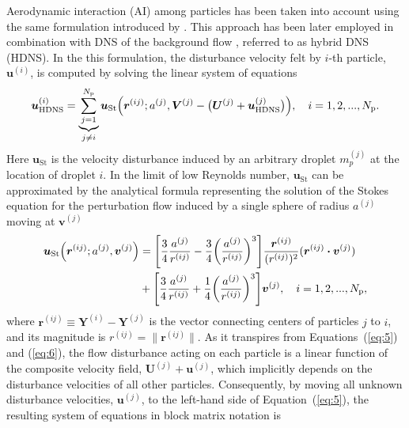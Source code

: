 \documentclass[../thesis.tex]{subfiles}
\begin{document}
Aerodynamic interaction (AI) among particles has been taken into account using the same formulation introduced by \cite{WAG05}. This approach has been later employed in combination with DNS of the background flow \citep{AGW07}, referred to as hybrid DNS (HDNS). In the this formulation, the disturbance velocity felt by $i$-th particle, $\boldsymbol{u}^{(i)}$, is computed by solving the linear system of equations
\begin{align}
\boldsymbol{u}_\text{HDNS}^{(i)}=
\underbrace{\sum_{j=1}^{N_{\text p}}}_{j\neq{i}}{\boldsymbol{u}_\text{St}}\Big(\boldsymbol{r}^{(ij)};a^{(j)},{\boldsymbol{V}^{(j)}}-\big({\boldsymbol{U}^{(j)}}+{\boldsymbol{u}_\text{HDNS}^{(j)}}\big)\Big),\quad
i=1,2,...,N_{\text p}.\label{eq:5}
\end{align}
Here ${\boldsymbol{u}_\text{St}}$ is the velocity disturbance induced by an arbitrary droplet $m_p^{(j)}$ at the location of droplet $i$. In the limit of low Reynolds number, ${\boldsymbol{u}_\text{St}}$ can be approximated by the analytical formula representing the solution of the Stokes equation for the perturbation flow induced by a single sphere of radius $a^{(j)}$ moving at ${\boldsymbol{v}}^{(j)}$
\begin{align}
\boldsymbol{u}_{\text{St}}\Big(\boldsymbol{r}^{(ij)};a^{(j)},{\boldsymbol{v}^{(j)}}\Big)&=\Bigg[\frac{3}{4}\frac{a^{(j)}}{{r}^{(ij)}}-\frac{3}{4}\bigg(\frac{a^{(j)}}{{r}^{(ij)}}\bigg)^{3}\Bigg]\frac{\boldsymbol{r}^{(ij)}}{({r}^{(ij)})^2}(\boldsymbol{r}^{(ij)}\boldsymbol{\cdot}\boldsymbol{v}^{(j)}) \nonumber\\
&+ \Bigg[\frac{3}{4}\frac{a^{(j)}}{{r}^{(ij)}}+\frac{1}{4}\bigg(\frac{a^{(j)}}{{r}^{(ij)}}\bigg)^{3}\Bigg]\boldsymbol{v}^{(j)},\quad
i=1,2,...,N_{\text p},\label{eq:6}
\end{align}
where $\boldsymbol{r}^{(ij)} \equiv \boldsymbol{Y}^{(i)}-\boldsymbol{Y}^{(j)}$ is the vector connecting centers of particles $j$ to $i$, and its magnitude is $\mathit{r}^{(ij)}=\|\boldsymbol{r}^{(ij)}\|$. As it transpires from Equations~(\ref{eq:5}) and (\ref{eq:6}), the flow disturbance acting on each particle is a linear function of the composite velocity field, ${\boldsymbol{U}^{(j)}}+{\boldsymbol{u}^{(j)}}$, which implicitly depends on the disturbance velocities of all other particles. Consequently, by moving all unknown disturbance velocities, $\boldsymbol{u}^{(j)}$, to the left-hand side of Equation~(\ref{eq:5}), the resulting system of equations in block matrix notation is
\end{document}
